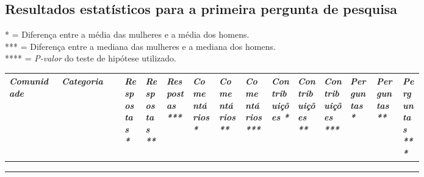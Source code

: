 
\begin{landscape}
\chapter{Resultados estatísticos para a primeira pergunta de pesquisa}
\label{app:q1}

\small
* = Diferença entre a média das mulheres e a média dos homens. \\
*** = Diferença entre a mediana das mulheres e a mediana dos homens. \\
**** = \textit{P-valor} do teste de hipótese utilizado. 

\begin{longtabu}{@{}
	p{0.1\linewidth}
	p{0.12\linewidth}
	P{0.04\linewidth}
	P{0.04\linewidth}
	P{0.05\linewidth}
	P{0.05\linewidth}
	P{0.05\linewidth}
	P{0.05\linewidth}
	P{0.05\linewidth}
	P{0.05\linewidth}
	P{0.05\linewidth}
	P{0.05\linewidth}
	P{0.05\linewidth}
	p{0.04\linewidth}@{}}
\toprule
\textit{Comunidade}  & \textit{Categoria}  
& \hspace{0pt}\textit{Respostas *} & \hspace{0pt}\textit{Respostas **} & \hspace{0pt}\textit{Respostas ***}
& \hspace{0pt}\textit{Comentários *} & \hspace{0pt}\textit{Comentários **} & \hspace{0pt}\textit{Comentários ***} 
& \hspace{0pt}\textit{Contribuições *}  & \hspace{0pt}\textit{Contribuições **} & \hspace{0pt}\textit{Contribuições ***}
& \hspace{0pt}\textit{Perguntas *} & \hspace{0pt}\textit{Perguntas **} & \hspace{0pt}\textit{Perguntas ***} \\ \midrule
\endhead

\\ \hline
\endfoot

\\
\endlastfoot


\end{longtabu}
\end{landscape}
